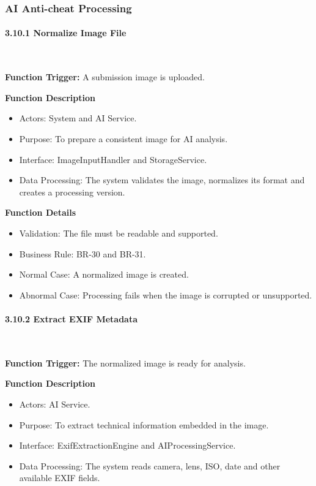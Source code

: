 \subsubsection{AI Anti-cheat Processing}
\label{subsubsec:ai-anti-cheat-processing}

\paragraph*{3.10.1 Normalize Image File}\leavevmode\\[-0.5em]
\label{par:normalize-image-file}

\textbf{Function Trigger:} A submission image is uploaded.

\textbf{Function Description}
\begin{itemize}[leftmargin=1.5em, nosep]
    \item Actors: System and AI Service.
    \item Purpose: To prepare a consistent image for AI analysis.
    \item Interface: ImageInputHandler and StorageService.
    \item Data Processing: The system validates the image, normalizes its format and creates a processing version.
\end{itemize}

\textbf{Function Details}
\begin{itemize}[leftmargin=1.5em, nosep]
    \item Validation: The file must be readable and supported.
    \item Business Rule: BR-30 and BR-31.
    \item Normal Case: A normalized image is created.
    \item Abnormal Case: Processing fails when the image is corrupted or unsupported.
\end{itemize}

\paragraph*{3.10.2 Extract EXIF Metadata}\leavevmode\\[-0.5em]
\label{par:extract-exif-metadata}

\textbf{Function Trigger:} The normalized image is ready for analysis.

\textbf{Function Description}
\begin{itemize}[leftmargin=1.5em, nosep]
    \item Actors: AI Service.
    \item Purpose: To extract technical information embedded in the image.
    \item Interface: ExifExtractionEngine and AIProcessingService.
    \item Data Processing: The system reads camera, lens, ISO, date and other available EXIF fields.
\end{itemize}

